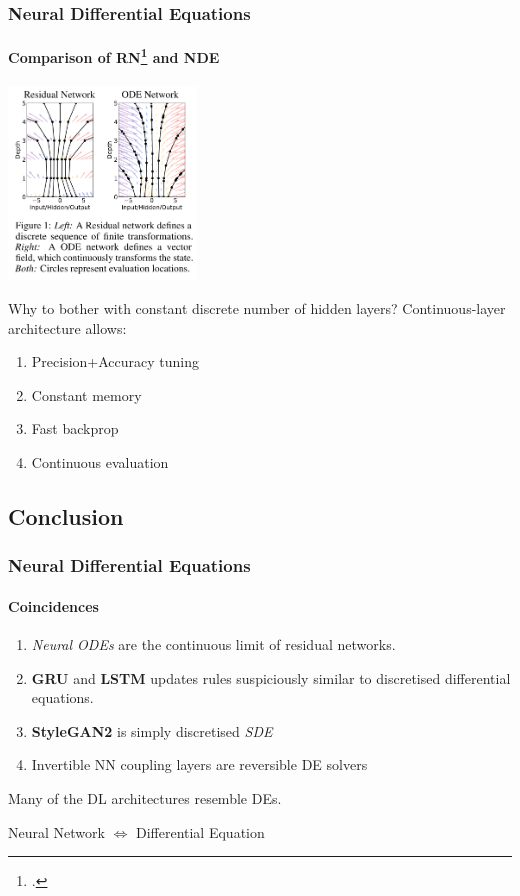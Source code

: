 \documentclass[
    11pt, %
    aspectratio=169, ]{beamer}%
\begin{document}
\setlength{\columnsep}{0cm}

\begin{frame}
    \frametitle{Neural Differential Equations}
    \framesubtitle{Comparison of RN\footcite{yinMathematicalUnderstandingResNet2019} and NDE}

    \begin{multicols}{2}

        \includegraphics[width=5cm]{assets/nde-rn-comp.png}

        Why to bother with constant discrete number of hidden layers? Continuous-layer
        architecture allows:

        \begin{enumerate}
            \item Precision+Accuracy tuning
            \item Constant memory
            \item Fast backprop
            \item Continuous evaluation
        \end{enumerate}
    \end{multicols}
\end{frame}

\subsection{Conclusion}

\begin{frame}
    \frametitle{Neural Differential Equations}
    \framesubtitle{Coincidences}
    \begin{enumerate}
        \item \textit{Neural ODEs} are the continuous limit of residual networks.
        \item \textbf{GRU} and \textbf{LSTM} updates rules suspiciously similar to
              discretised differential equations.
        \item \textbf{StyleGAN2} is simply discretised \textit{SDE}
        \item Invertible NN coupling layers are reversible DE solvers
    \end{enumerate}
    Many of the DL architectures resemble DEs.
    \begin{block}{}
        Neural Network \(\Leftrightarrow\) Differential Equation
    \end{block}
\end{frame}
\end{document}
